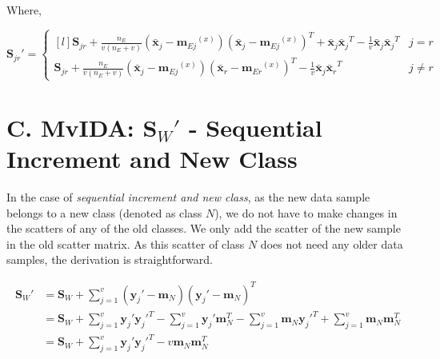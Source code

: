 \noindent
Where,

\small
\begin{equation*}
\textbf{S}_{jr}' = \left\{\begin{matrix*}[l]
\textbf{S}_{jr} + \frac{n_E}{v (n_E+v)} \left ( \bar{\textbf{x}}_j - {\textbf{m}_{Ej}}^{(x)} \right ) \left ( \bar{\textbf{x}}_j - {\textbf{m}_{Ej}}^{(x)} \right )^T + \bar{\textbf{x}}_j {\bar{\textbf{x}}_j}^T - \frac{1}{v} \bar{\textbf{x}}_j {\bar{\textbf{x}}_j}^T & j=r
\\[0.3cm] 
\textbf{S}_{jr} + \frac{n_E}{v (n_E+v)} \left ( \bar{\textbf{x}}_j - {\textbf{m}_{Ej}}^{(x)} \right ) \left ( \bar{\textbf{x}}_r - {\textbf{m}_{Er}}^{(x)} \right )^T - \frac{1}{v} \bar{\textbf{x}}_j {\bar{\textbf{x}}_r}^T & j \neq r
\end{matrix*}\right.
\end{equation*}
\normalsize










\section*{C. MvIDA: $\textbf{S}_W'$ - Sequential Increment and New Class}
\label{proof:MvIDA_SeqNew}
In the case of \textit{sequential increment and new class}, as the new data sample belongs to a new class (denoted as class $N$), we do not have to make changes in the scatters of any of the old classes. We only add the scatter of the new sample in the old scatter matrix. As this scatter of class $N$ does not need any older data samples, the derivation is straightforward.

\small
\begin{equation*}
\begin{split}
\textbf{S}_W' & = \textbf{S}_W + \sum_{j=1}^{v} \left( \textbf{y}_j' - \textbf{m}_N \right) \left( \textbf{y}_j' - \textbf{m}_N \right)^T
\\
& = \textbf{S}_W + \sum_{j=1}^{v} \textbf{y}_j' {\textbf{y}_j'}^T - \sum_{j=1}^{v} \textbf{y}_j' \textbf{m}_N^T - \sum_{j=1}^{v} \textbf{m}_N {\textbf{y}_j'}^T + \sum_{j=1}^{v} \textbf{m}_N \textbf{m}_N^T
\\
& = \textbf{S}_W + \sum_{j=1}^{v} \textbf{y}_j' {\textbf{y}_j'}^T  - v \textbf{m}_N \textbf{m}_N^T
\\
\end{split}
\end{equation*}

